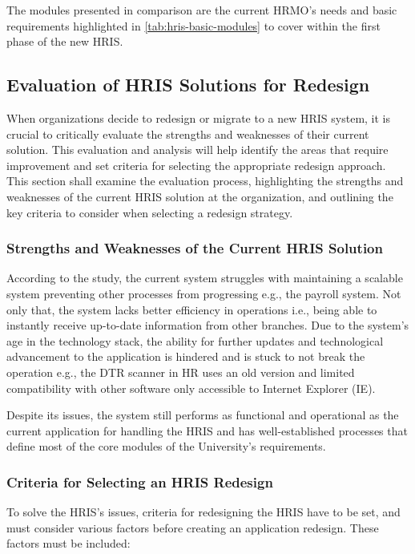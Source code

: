     The modules presented in comparison are the current HRMO's needs and basic requirements highlighted in \ref*{tab:hris-basic-modules} to cover within the first phase of the new HRIS.
    
    
    
    \subsection{Evaluation of HRIS Solutions for Redesign}
    
    When organizations decide to redesign or migrate to a new HRIS system, it is crucial to critically evaluate the strengths and weaknesses of their current solution. This evaluation and analysis will help identify the areas that require improvement and set criteria for selecting the appropriate redesign approach. This section shall examine the evaluation process, highlighting the strengths and weaknesses of the current HRIS solution at the organization, and outlining the key criteria to consider when selecting a redesign strategy.
    
        \subsubsection{Strengths and Weaknesses of the Current HRIS Solution}
        According to the study, the current system struggles with maintaining a scalable system preventing other processes from progressing e.g., the payroll system. Not only that, the system lacks better efficiency in operations i.e., being able to instantly receive up-to-date information from other branches. Due to the system's age in the technology stack, the ability for further updates and technological advancement to the application is hindered and is stuck to not break the operation e.g., the DTR scanner in HR uses an old version and limited compatibility with other software only accessible to Internet Explorer (IE). 

        Despite its issues, the system still performs as functional and operational as the current application for handling the HRIS and has well-established processes that define most of the core modules of the University's requirements. 
        
        \subsubsection{Criteria for Selecting an HRIS Redesign}
        To solve the HRIS's issues, criteria for redesigning the HRIS have to be set, and must consider various factors before creating an application redesign. These factors must be included:


